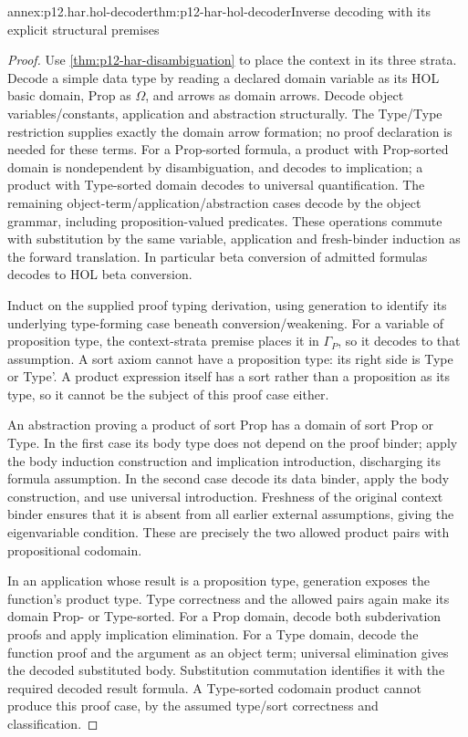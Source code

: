 \begin{annexitem}{annex:p12.har.hol-decoder}{thm:p12-har-hol-decoder}{Inverse decoding with its explicit structural premises}
\begin{proof}
Use \cref{thm:p12-har-disambiguation} to place the context in its three strata.
Decode a simple data type by reading a declared domain variable as its
HOL basic domain, Prop as \(\Omega\), and arrows as domain arrows.
Decode object variables/constants, application and abstraction structurally.
The Type/Type restriction supplies exactly the domain arrow formation;
no proof declaration is needed for these terms. For a Prop-sorted formula,
a product with Prop-sorted domain is nondependent by disambiguation, and
decodes to implication; a product with Type-sorted domain decodes to
universal quantification. The remaining object-term/application/abstraction
cases decode by the object grammar, including proposition-valued predicates.
These operations commute with substitution by the same variable,
application and fresh-binder induction as the forward translation.
In particular beta conversion of admitted formulas decodes to HOL beta
conversion.

Induct on the supplied proof typing derivation, using generation to
identify its underlying type-forming case beneath conversion/weakening.
For a variable of proposition type, the context-strata premise places it
in \(\Gamma_P\), so it decodes to that assumption. A sort axiom
cannot have a proposition type: its right side is Type or Type'. A
product expression itself has a sort rather than a proposition as its
type, so it cannot be the subject of this proof case either.

An abstraction proving a product of sort Prop has a domain of sort
Prop or Type. In the first case its body type does not depend on the
proof binder; apply the body induction construction and implication
introduction, discharging its formula assumption. In the second case
decode its data binder, apply the body construction, and use universal
introduction. Freshness of the original context binder ensures that it
is absent from all earlier external assumptions, giving the eigenvariable
condition. These are precisely the two allowed product pairs with
propositional codomain.

In an application whose result is a proposition type, generation exposes
the function's product type. Type correctness and the allowed pairs again
make its domain Prop- or Type-sorted. For a Prop domain, decode both
subderivation proofs and apply implication elimination. For a Type domain,
decode the function proof and the argument as an object term; universal
elimination gives the decoded substituted body. Substitution commutation
identifies it with the required decoded result formula. A Type-sorted
codomain product cannot produce this proof case, by the assumed
type/sort correctness and classification.


\end{proof}
\end{annexitem}
